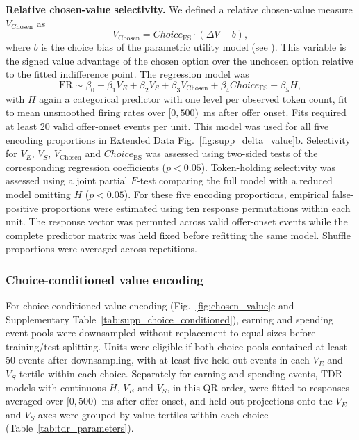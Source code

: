 \documentclass[pdflatex,sn-mathphys-num]{sn-jnl}%
\begin{document}
\textbf{Relative chosen-value selectivity.} We defined a relative chosen-value measure $V_{\mathrm{Chosen}}$ as
\begin{equation}
    V_{\mathrm{Chosen}} = \mathit{Choice}_{\mathrm{ES}}\cdot(\Delta V-b),
\end{equation}
where $b$ is the choice bias of the parametric utility model (see ).
This variable is the signed value advantage of the chosen option over the unchosen option relative to the fitted indifference point. The regression model was
\begin{equation}
    \mathrm{FR} \sim \beta_0 + \beta_1 V_E + \beta_2 V_S + \beta_3 V_{\mathrm{Chosen}} + \beta_4 \mathit{Choice}_{\mathrm{ES}} + \beta_5 H,
\end{equation}
with $H$ again a categorical predictor with one level per observed token count, fit to mean unsmoothed firing rates over $[0,500)$~ms after offer onset. Fits required at least 20 valid offer-onset events per unit. This model was used for all five encoding proportions in Extended Data Fig.~\ref{fig:supp_delta_value}b. Selectivity for $V_E$, $V_S$, $V_{\mathrm{Chosen}}$ and $\mathit{Choice}_{\mathrm{ES}}$ was assessed using two-sided tests of the corresponding regression coefficients ($p<0.05$). Token-holding selectivity was assessed using a joint partial $F$-test comparing the full model with a reduced model omitting $H$ ($p<0.05$). For these five encoding proportions, empirical false-positive proportions were estimated using ten response permutations within each unit. The response vector was permuted across valid offer-onset events while the complete predictor matrix was held fixed before refitting the same model. Shuffle proportions were averaged across repetitions.

\subsubsection{Choice-conditioned value encoding}\label{sec:m_conditioned}
For choice-conditioned value encoding (Fig.~\ref{fig:chosen_value}c and Supplementary Table~\ref{tab:supp_choice_conditioned}), earning and spending event pools were downsampled without replacement to equal sizes before training/test splitting. Units were eligible if both choice pools contained at least 50 events after downsampling, with at least five held-out events in each $V_E$ and $V_S$ tertile within each choice. Separately for earning and spending events, TDR models with continuous $H$, $V_E$ and $V_S$, in this QR order, were fitted to responses averaged over $[0,500)$~ms after offer onset, and held-out projections onto the $V_E$ and $V_S$ axes were grouped by value tertiles within each choice (Table~\ref{tab:tdr_parameters}). 
\end{document}
